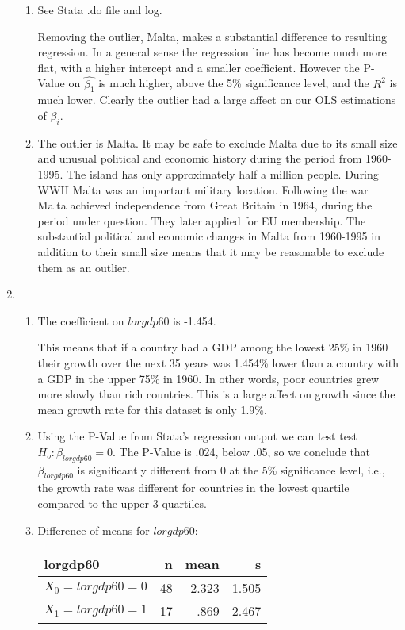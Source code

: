 \documentclass[12pt]{chmullighw}
\begin{document}
\begin{enumerate}
\begin{enumerate}
	\item See Stata .do file and log.
	
	Removing the outlier, Malta, makes a substantial difference to resulting regression. In a general sense the regression line has become much more flat, with a higher intercept and a smaller coefficient. However the P-Value on $\hat{\beta_1}$ is much higher, above the 5\% significance level, and the $R^2$ is much lower. Clearly the outlier had a large affect on our OLS estimations of $\beta_i$.
	
	\item The outlier is Malta. It may be safe to exclude Malta due to its small size and unusual political and economic history during the period from 1960-1995. The island has only approximately half a million people. During WWII Malta was an important military location. Following the war Malta achieved independence from Great Britain in 1964, during the period under question. They later applied for EU membership. The substantial political and economic changes in Malta from 1960-1995 in addition to their small size means that it may be reasonable to exclude them as an outlier.
	
	\end{enumerate} %

\item
	\begin{enumerate}
	
	\item The coefficient on $lorgdp60$ is -1.454.
	
	This means that if a country had a GDP among the lowest 25\% in 1960 their growth over the next 35 years was 1.454\% lower than a country with a GDP in the upper 75\% in 1960. In other words, poor countries grew more slowly than rich countries. This is a large affect on growth since the mean growth rate for this dataset is only 1.9\%.  
	
	\item Using the P-Value from Stata's regression output we can test test $H_o: \beta_{lorgdp60} = 0$. The P-Value is .024, below .05, so we conclude that $\beta_{lorgdp60}$ is significantly different from 0 at the 5\% significance level, i.e., the growth rate was different for countries in the lowest quartile compared to the upper 3 quartiles.
	
	\item Difference of means for $lorgdp60$:
		\begin{tabular}{|l|r|r|r|}
			\hline
			\textbf{lorgdp60} & \textbf{n} & \textbf{mean}  & \textbf{s} \\
			\hline
			$X_0 = lorgdp60 = 0$ & 48 & 2.323 & 1.505\\
			\hline
			$X_1 = lorgdp60 = 1$ & 17 & .869 & 2.467\\
			\hline
		\end{tabular}
		

\end{enumerate}
\end{enumerate}
\end{document}

